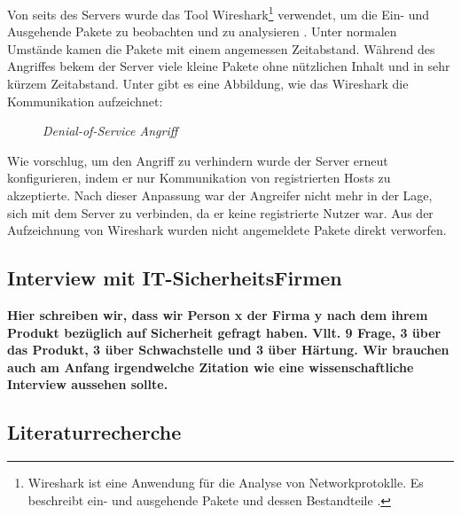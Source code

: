 Von seits des Servers wurde das Tool Wireshark\footnote{Wireshark ist eine Anwendung für die Analyse von Networkprotoklle.
Es beschreibt ein- und ausgehende Pakete und dessen Bestandteile \cite{refst:wisa}.} verwendet, um die Ein- und Ausgehende
Pakete zu beobachten und zu analysieren \cite{refart:UBEC}. Unter normalen Umstände kamen die Pakete mit einem angemessen
Zeitabstand. Während des Angriffes bekem der Server viele kleine Pakete ohne nützlichen Inhalt und in sehr kürzem Zeitabstand.
Unter gibt es eine Abbildung, wie das Wireshark die Kommunikation aufzeichnet:

\begin{figure}[H]
  \caption{\textit{Denial-of-Service Angriff} \cite{refst:wisa}}
  \label{fig:refst_wisa}
\end{figure}


Wie \cite{refip:NYRS} vorschlug, um den Angriff zu verhindern wurde der Server erneut konfigurieren, indem er nur
Kommunikation von registrierten Hosts zu akzeptierte. Nach dieser Anpassung war der Angreifer nicht mehr in der Lage, 
sich mit dem Server zu verbinden, da er keine registrierte Nutzer war. Aus der Aufzeichnung von Wireshark wurden nicht 
angemeldete Pakete direkt verworfen.

\subsection{Interview mit IT-SicherheitsFirmen}

\textbf{Hier schreiben wir, dass wir Person x der Firma y nach dem ihrem Produkt bezüglich auf Sicherheit gefragt haben.
Vllt. 9 Frage, 3 über das Produkt, 3 über Schwachstelle und 3 über Härtung. Wir brauchen auch am Anfang irgendwelche Zitation
wie eine wissenschaftliche Interview aussehen sollte.}

\subsection{Literaturrecherche}

